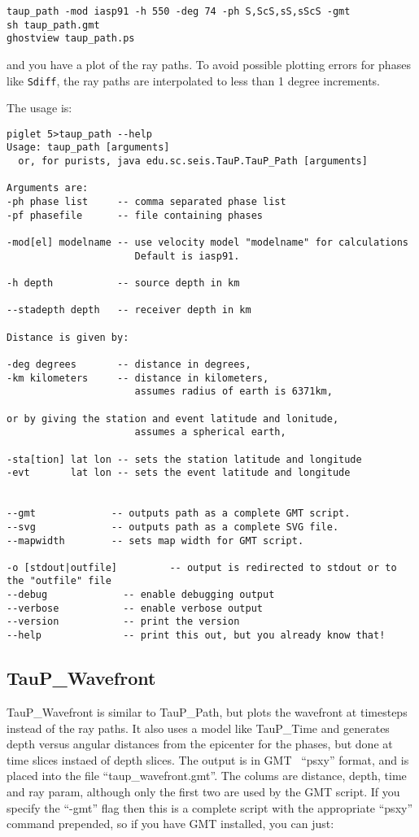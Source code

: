 \begin{verbatim}
taup_path -mod iasp91 -h 550 -deg 74 -ph S,ScS,sS,sScS -gmt
sh taup_path.gmt
ghostview taup_path.ps
\end{verbatim}

and you have a plot of the ray paths. To avoid possible plotting errors for
phases like \texttt{Sdiff}, the ray paths are interpolated to less than 
1 degree increments.

The usage is:
\begin{verbatim}
piglet 5>taup_path --help
Usage: taup_path [arguments]
  or, for purists, java edu.sc.seis.TauP.TauP_Path [arguments]

Arguments are:
-ph phase list     -- comma separated phase list
-pf phasefile      -- file containing phases

-mod[el] modelname -- use velocity model "modelname" for calculations
                      Default is iasp91.

-h depth           -- source depth in km

--stadepth depth   -- receiver depth in km

Distance is given by:

-deg degrees       -- distance in degrees,
-km kilometers     -- distance in kilometers,
                      assumes radius of earth is 6371km,

or by giving the station and event latitude and lonitude,
                      assumes a spherical earth,

-sta[tion] lat lon -- sets the station latitude and longitude
-evt       lat lon -- sets the event latitude and longitude


--gmt             -- outputs path as a complete GMT script.
--svg             -- outputs path as a complete SVG file.
--mapwidth        -- sets map width for GMT script.

-o [stdout|outfile]         -- output is redirected to stdout or to the "outfile" file
--debug             -- enable debugging output
--verbose           -- enable verbose output
--version           -- print the version
--help              -- print this out, but you already know that!
\end{verbatim} 

\subsection{TauP\_Wavefront}
TauP\_Wavefront is similar to TauP\_Path, but plots the wavefront at timesteps instead of the
ray paths. It also uses a model like TauP\_Time and
generates  depth versus
angular distances from the epicenter for the phases, but done at time slices instaed of depth slices. 
The output is in GMT~\cite{GMT} ``psxy'' format, and is
placed into the file ``taup\_wavefront.gmt''. 
The colums are distance, depth, time and ray param, although only the first two are used by the GMT script.
If you specify the ``-gmt'' flag then this 
is a complete script with the appropriate ``psxy'' command prepended, so if you
have GMT installed, you can just:

